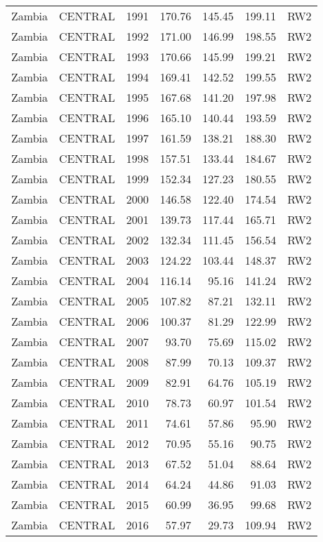 \begin{longtable}{lllrrrl}
  Zambia & CENTRAL & 1991 & 170.76 & 145.45 & 199.11 & RW2 \\ 
  Zambia & CENTRAL & 1992 & 171.00 & 146.99 & 198.55 & RW2 \\ 
  Zambia & CENTRAL & 1993 & 170.66 & 145.99 & 199.21 & RW2 \\ 
  Zambia & CENTRAL & 1994 & 169.41 & 142.52 & 199.55 & RW2 \\ 
  Zambia & CENTRAL & 1995 & 167.68 & 141.20 & 197.98 & RW2 \\ 
  Zambia & CENTRAL & 1996 & 165.10 & 140.44 & 193.59 & RW2 \\ 
  Zambia & CENTRAL & 1997 & 161.59 & 138.21 & 188.30 & RW2 \\ 
  Zambia & CENTRAL & 1998 & 157.51 & 133.44 & 184.67 & RW2 \\ 
  Zambia & CENTRAL & 1999 & 152.34 & 127.23 & 180.55 & RW2 \\ 
  Zambia & CENTRAL & 2000 & 146.58 & 122.40 & 174.54 & RW2 \\ 
  Zambia & CENTRAL & 2001 & 139.73 & 117.44 & 165.71 & RW2 \\ 
  Zambia & CENTRAL & 2002 & 132.34 & 111.45 & 156.54 & RW2 \\ 
  Zambia & CENTRAL & 2003 & 124.22 & 103.44 & 148.37 & RW2 \\ 
  Zambia & CENTRAL & 2004 & 116.14 & 95.16 & 141.24 & RW2 \\ 
  Zambia & CENTRAL & 2005 & 107.82 & 87.21 & 132.11 & RW2 \\ 
  Zambia & CENTRAL & 2006 & 100.37 & 81.29 & 122.99 & RW2 \\ 
  Zambia & CENTRAL & 2007 & 93.70 & 75.69 & 115.02 & RW2 \\ 
  Zambia & CENTRAL & 2008 & 87.99 & 70.13 & 109.37 & RW2 \\ 
  Zambia & CENTRAL & 2009 & 82.91 & 64.76 & 105.19 & RW2 \\ 
  Zambia & CENTRAL & 2010 & 78.73 & 60.97 & 101.54 & RW2 \\ 
  Zambia & CENTRAL & 2011 & 74.61 & 57.86 & 95.90 & RW2 \\ 
  Zambia & CENTRAL & 2012 & 70.95 & 55.16 & 90.75 & RW2 \\ 
  Zambia & CENTRAL & 2013 & 67.52 & 51.04 & 88.64 & RW2 \\ 
  Zambia & CENTRAL & 2014 & 64.24 & 44.86 & 91.03 & RW2 \\ 
  Zambia & CENTRAL & 2015 & 60.99 & 36.95 & 99.68 & RW2 \\ 
  Zambia & CENTRAL & 2016 & 57.97 & 29.73 & 109.94 & RW2 \\ 

\end{longtable}
